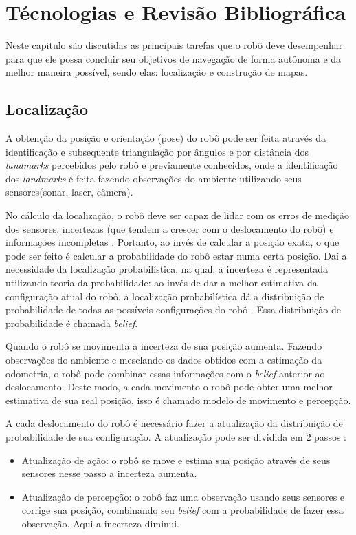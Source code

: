 \chapter{Técnologias e Revisão Bibliográfica}
\label{tecnologiasRevisoesBib}

  Neste capitulo são discutidas as principais tarefas que o robô deve desempenhar
  para que ele possa concluir seu objetivos de navegação de forma autônoma e da melhor maneira possível, sendo elas: localização e construção de mapas.
  
\section{Localização}
A obtenção da posição e orientação (pose) do robô pode ser feita através da identificação e 
subsequente triangulação por ângulos e por distância dos \textit{landmarks} percebidos pelo robô e
 previamente conhecidos, onde a identificação dos \textit{landmarks} 
 é feita fazendo observações do ambiente utilizando seus sensores(sonar, laser, câmera).
 
 No cálculo da localização, o robô deve ser capaz de lidar com os erros de medição dos sensores, 
 incertezas (que tendem a crescer com o deslocamento do robô) 
 e informações incompletas \cite{localization1}.  Portanto, ao invés de calcular a posição exata, 
 o que pode ser feito é calcular a probabilidade do robô estar numa certa posição. Daí a necessidade da 
 localização probabilística, na qual, a incerteza é representada utilizando teoria da probabilidade: 
 ao invés de dar a melhor estimativa da configuração atual do robô, 
 a localização probabilística dá a distribuição de probabilidade de todas as possíveis 
 configurações do robô \cite{localization1}. Essa distribuição de probabilidade é chamada \textit{belief}.
 
 Quando o robô se movimenta a incerteza de sua posição aumenta. 
 Fazendo observações do ambiente e mesclando os dados obtidos com a estimação da odometria, 
 o robô pode combinar essas informações com o \textit{belief} anterior ao deslocamento. 
 Deste modo, a cada movimento o robô pode
 obter uma melhor estimativa de sua real posição, isso é chamado modelo de movimento e percepção.
 
 A cada deslocamento do robô é necessário fazer a atualização da distribuição de probabilidade de sua configuração. 
 A atualização pode ser dividida em 2 passos \cite{localization1}:
 \begin{itemize}
  \item Atualização de ação: o robô se move e estima sua posição através de seus sensores nesse passo a incerteza aumenta.
  \item Atualização de percepção: o robô faz uma observação usando seus sensores e corrige sua posição, 
  combinando seu \textit{belief} com a probabilidade de fazer essa observação.
  Aqui a incerteza diminui.
 \end{itemize}

